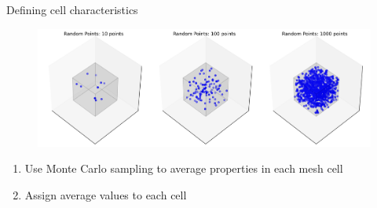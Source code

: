 \documentclass[10pt,hyperref={colorlinks,citecolor=blue,urlcolor=peking_blue,linkcolor=}]{beamer}
\theoremstyle{plain}
\begin{document}
\begin{frame}{Defining cell characteristics}
\begin{figure}[Individual Cell Sampling]
\begin{center}
\includegraphics[width=1\linewidth]{../Figures/FunctionallyDefinedSoil/IndividualCellSampling.png}
\end{center}
\end{figure}
\begin{enumerate}
\item Use Monte Carlo sampling to average properties in each mesh cell
\item Assign average values to each cell
\end{enumerate}
\end{frame}
\end{document}

